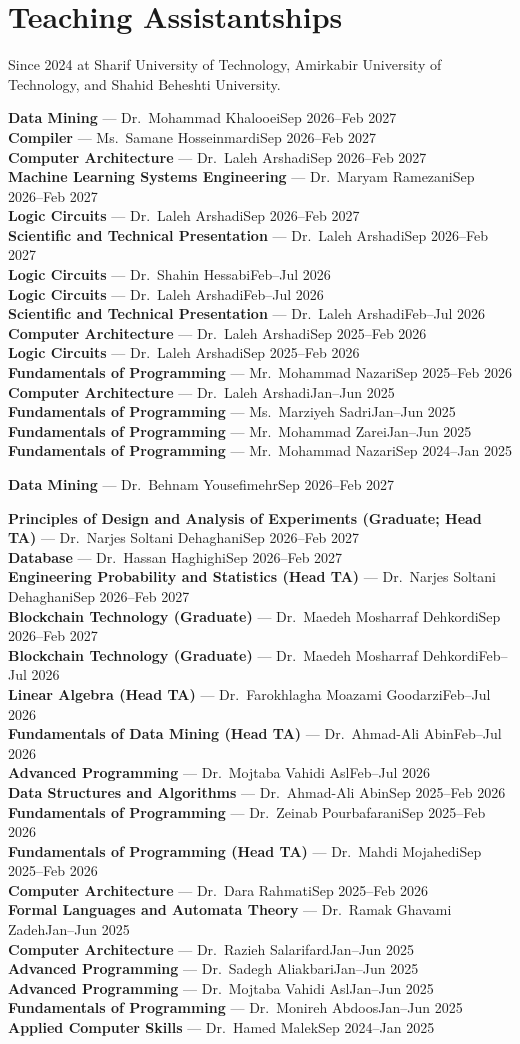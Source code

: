 \documentclass[11pt,a4paper]{article}
\newcommand{\subheader}[1]{%
  \vspace{0.35em}{\bfseries\normalsize #1}\par\vspace{0.2em}%
}
\newcommand{\ta}[3]{%
  {\small\textbf{#1} --- #2\hfill {\color{muted}#3}}\\[0.05em]
}
\begin{document}
\section*{Teaching Assistantships}

{\small Since 2024 at Sharif University of Technology, Amirkabir University of Technology, and Shahid Beheshti University.}\\[0.28em]

\subheader{Sharif University of Technology}
\ta{Data Mining}{Dr.\ Mohammad Khalooei}{Sep 2026--Feb 2027}
\ta{Compiler}{Ms.\ Samane Hosseinmardi}{Sep 2026--Feb 2027}
\ta{Computer Architecture}{Dr.\ Laleh Arshadi}{Sep 2026--Feb 2027}
\ta{Machine Learning Systems Engineering}{Dr.\ Maryam Ramezani}{Sep 2026--Feb 2027}
\ta{Logic Circuits}{Dr.\ Laleh Arshadi}{Sep 2026--Feb 2027}
\ta{Scientific and Technical Presentation}{Dr.\ Laleh Arshadi}{Sep 2026--Feb 2027}
\ta{Logic Circuits}{Dr.\ Shahin Hessabi}{Feb--Jul 2026}
\ta{Logic Circuits}{Dr.\ Laleh Arshadi}{Feb--Jul 2026}
\ta{Scientific and Technical Presentation}{Dr.\ Laleh Arshadi}{Feb--Jul 2026}
\ta{Computer Architecture}{Dr.\ Laleh Arshadi}{Sep 2025--Feb 2026}
\ta{Logic Circuits}{Dr.\ Laleh Arshadi}{Sep 2025--Feb 2026}
\ta{Fundamentals of Programming}{Mr.\ Mohammad Nazari}{Sep 2025--Feb 2026}
\ta{Computer Architecture}{Dr.\ Laleh Arshadi}{Jan--Jun 2025}
\ta{Fundamentals of Programming}{Ms.\ Marziyeh Sadri}{Jan--Jun 2025}
\ta{Fundamentals of Programming}{Mr.\ Mohammad Zarei}{Jan--Jun 2025}
\ta{Fundamentals of Programming}{Mr.\ Mohammad Nazari}{Sep 2024--Jan 2025}

\subheader{Amirkabir University of Technology}
\ta{Data Mining}{Dr.\ Behnam Yousefimehr}{Sep 2026--Feb 2027}

\subheader{Shahid Beheshti University}
\ta{Principles of Design and Analysis of Experiments (Graduate; Head TA)}{Dr.\ Narjes Soltani Dehaghani}{Sep 2026--Feb 2027}
\ta{Database}{Dr.\ Hassan Haghighi}{Sep 2026--Feb 2027}
\ta{Engineering Probability and Statistics (Head TA)}{Dr.\ Narjes Soltani Dehaghani}{Sep 2026--Feb 2027}
\ta{Blockchain Technology (Graduate)}{Dr.\ Maedeh Mosharraf Dehkordi}{Sep 2026--Feb 2027}
\ta{Blockchain Technology (Graduate)}{Dr.\ Maedeh Mosharraf Dehkordi}{Feb--Jul 2026}
\ta{Linear Algebra (Head TA)}{Dr.\ Farokhlagha Moazami Goodarzi}{Feb--Jul 2026}
\ta{Fundamentals of Data Mining (Head TA)}{Dr.\ Ahmad-Ali Abin}{Feb--Jul 2026}
\ta{Advanced Programming}{Dr.\ Mojtaba Vahidi Asl}{Feb--Jul 2026}
\ta{Data Structures and Algorithms}{Dr.\ Ahmad-Ali Abin}{Sep 2025--Feb 2026}
\ta{Fundamentals of Programming}{Dr.\ Zeinab Pourbafarani}{Sep 2025--Feb 2026}
\ta{Fundamentals of Programming (Head TA)}{Dr.\ Mahdi Mojahedi}{Sep 2025--Feb 2026}
\ta{Computer Architecture}{Dr.\ Dara Rahmati}{Sep 2025--Feb 2026}
\ta{Formal Languages and Automata Theory}{Dr.\ Ramak Ghavami Zadeh}{Jan--Jun 2025}
\ta{Computer Architecture}{Dr.\ Razieh Salarifard}{Jan--Jun 2025}
\ta{Advanced Programming}{Dr.\ Sadegh Aliakbari}{Jan--Jun 2025}
\ta{Advanced Programming}{Dr.\ Mojtaba Vahidi Asl}{Jan--Jun 2025}
\ta{Fundamentals of Programming}{Dr.\ Monireh Abdoos}{Jan--Jun 2025}
\ta{Applied Computer Skills}{Dr.\ Hamed Malek}{Sep 2024--Jan 2025}
\end{document}

